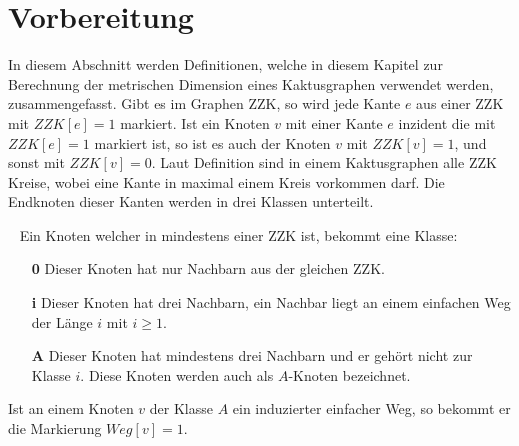 \section{Vorbereitung}
\vspace{-4mm}
In diesem Abschnitt werden Definitionen, welche in diesem Kapitel zur Berechnung der metrischen Dimension eines Kaktusgraphen verwendet werden, zusammengefasst.
\vspace{-2mm}\newline\newline
Gibt es im Graphen ZZK, so wird jede Kante $e$ aus einer ZZK mit $ZZK[e]=1$ markiert. Ist ein Knoten $v$ mit einer Kante $e$ inzident die mit $ZZK[e]=1$ markiert ist, so ist es auch der Knoten $v$ mit $ZZK[v]=1$, und sonst mit $ZZK[v]=0$.\vspace{-2mm}\newline\newline
Laut Definition sind in einem Kaktusgraphen alle ZZK Kreise, wobei eine Kante in maximal einem Kreis vorkommen darf. Die Endknoten dieser Kanten werden in drei Klassen unterteilt.
\begin{defi}~\newline
Ein Knoten welcher in mindestens einer ZZK ist, bekommt eine Klasse:
\begin{itemize}
\item[\textbf{0}] Dieser Knoten hat nur Nachbarn aus der gleichen ZZK.
\item[\textbf{i}] Dieser Knoten hat drei Nachbarn, ein Nachbar liegt an einem einfachen Weg der Länge $i$ mit $i \geq 1$.
\item[\textbf{A}] Dieser Knoten hat mindestens drei Nachbarn und er gehört nicht zur Klasse $i$. Diese Knoten werden auch als $A$-Knoten bezeichnet.
\end{itemize}
\end{defi}\vspace{-1mm}
Ist an einem Knoten $v$ der Klasse $A$ ein induzierter einfacher Weg, so bekommt er die Markierung $Weg[v]=1$.


